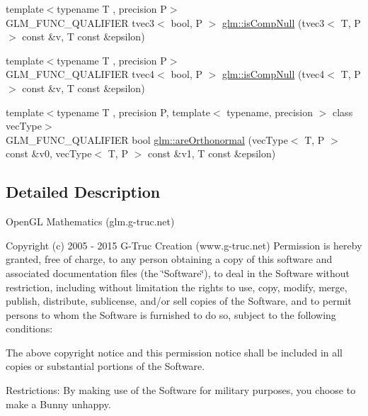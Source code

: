 \begin{DoxyCompactItemize}
\item 
{\footnotesize template$<$typename T , precision P$>$ }\\G\+L\+M\+\_\+\+F\+U\+N\+C\+\_\+\+Q\+U\+A\+L\+I\+F\+I\+E\+R tvec3$<$ bool, P $>$ \hyperlink{namespaceglm_a5972ae9ce1c88fcd539f51a218af865f}{glm\+::is\+Comp\+Null} (tvec3$<$ T, P $>$ const \&v, T const \&epsilon)
\item 
{\footnotesize template$<$typename T , precision P$>$ }\\G\+L\+M\+\_\+\+F\+U\+N\+C\+\_\+\+Q\+U\+A\+L\+I\+F\+I\+E\+R tvec4$<$ bool, P $>$ \hyperlink{namespaceglm_ac4b73e500deea02815aa386fe10296c8}{glm\+::is\+Comp\+Null} (tvec4$<$ T, P $>$ const \&v, T const \&epsilon)
\item 
{\footnotesize template$<$typename T , precision P, template$<$ typename, precision $>$ class vec\+Type$>$ }\\G\+L\+M\+\_\+\+F\+U\+N\+C\+\_\+\+Q\+U\+A\+L\+I\+F\+I\+E\+R bool \hyperlink{group__gtx__vector__query_ga89c82bc60e5b84e4489b74c15a134caf}{glm\+::are\+Orthonormal} (vec\+Type$<$ T, P $>$ const \&v0, vec\+Type$<$ T, P $>$ const \&v1, T const \&epsilon)
\end{DoxyCompactItemize}


\subsection{Detailed Description}
Open\+G\+L Mathematics (glm.\+g-\/truc.\+net)

Copyright (c) 2005 -\/ 2015 G-\/\+Truc Creation (www.\+g-\/truc.\+net) Permission is hereby granted, free of charge, to any person obtaining a copy of this software and associated documentation files (the \char`\"{}\+Software\char`\"{}), to deal in the Software without restriction, including without limitation the rights to use, copy, modify, merge, publish, distribute, sublicense, and/or sell copies of the Software, and to permit persons to whom the Software is furnished to do so, subject to the following conditions\+:

The above copyright notice and this permission notice shall be included in all copies or substantial portions of the Software.

Restrictions\+: By making use of the Software for military purposes, you choose to make a Bunny unhappy.


